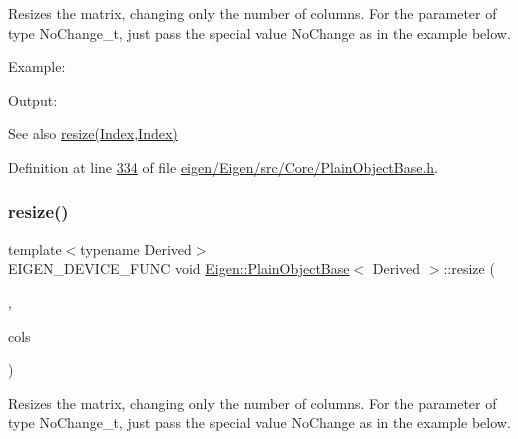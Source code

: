 Resizes the matrix, changing only the number of columns. For the parameter of type No\+Change\+\_\+t, just pass the special value {\ttfamily No\+Change} as in the example below.

Example\+: 
\begin{DoxyCodeInclude}
\end{DoxyCodeInclude}
 Output\+: 
\begin{DoxyVerbInclude}
\end{DoxyVerbInclude}


\begin{DoxySeeAlso}{See also}
\hyperlink{class_eigen_1_1_plain_object_base_a99d9054ee2d5a40c6e00ded0265e9cea}{resize(\+Index,\+Index)} 
\end{DoxySeeAlso}


Definition at line \hyperlink{eigen_2_eigen_2src_2_core_2_plain_object_base_8h_source_l00334}{334} of file \hyperlink{eigen_2_eigen_2src_2_core_2_plain_object_base_8h_source}{eigen/\+Eigen/src/\+Core/\+Plain\+Object\+Base.\+h}.

\mbox{\label{class_eigen_1_1_plain_object_base_ab71a655f73d05a0e389e3ed13b6fe5f3}} 
\subsubsection{\texorpdfstring{resize()}{resize()}\hspace{0.1cm}{\footnotesize\ttfamily [6/8]}}
{\footnotesize\ttfamily template$<$typename Derived$>$ \\
E\+I\+G\+E\+N\+\_\+\+D\+E\+V\+I\+C\+E\+\_\+\+F\+U\+NC void \hyperlink{class_eigen_1_1_plain_object_base}{Eigen\+::\+Plain\+Object\+Base}$<$ Derived $>$\+::resize (\begin{DoxyParamCaption}\item[{No\+Change\+\_\+t}]{,  }\item[{\hyperlink{namespace_eigen_a62e77e0933482dafde8fe197d9a2cfde}{Index}}]{cols }\end{DoxyParamCaption})\hspace{0.3cm}{\ttfamily [inline]}}

Resizes the matrix, changing only the number of columns. For the parameter of type No\+Change\+\_\+t, just pass the special value {\ttfamily No\+Change} as in the example below.

